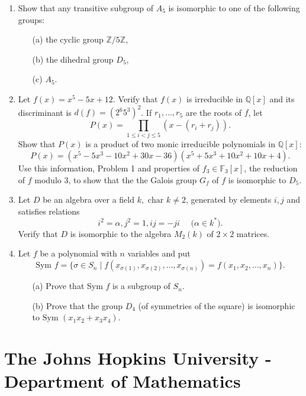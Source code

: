 \documentclass{article}
\begin{document}
\begin{enumerate}
    \item Show that any transitive subgroup of \(A_{5}\) is isomorphic to one of the following groups:
    \begin{itemize}
        \item[(a)] the cyclic group \(\mathbb{Z}/5\mathbb{Z}\),
        \item[(b)] the dihedral group \(D_{5}\),
        \item[(c)] \(A_{5}\).
    \end{itemize}

    \item Let \(f(x)=x^{5}-5x+12\). Verify that \(f(x)\) is irreducible in \(\mathbb{Q}[x]\) and its discriminant is \(d(f)=(2^{6}5^{3})^{2}\). If \(r_{1},\ldots,r_{5}\) are the roots of \(f\), let
    \[P(x)=\prod_{1\leq i<j\leq 5}(x-(r_{i}+r_{j})).\]
    Show that \(P(x)\) is a product of two monic irreducible polynomials in \(\mathbb{Q}[x]\):
    \[P(x)=(x^{5}-5x^{3}-10x^{2}+30x-36)(x^{5}+5x^{3}+10x^{2}+10x+4).\]
    Use this information, Problem 1 and properties of \(f_{3}\in\mathbb{F}_{3}[x]\), the reduction of \(f\) modulo 3, to show that the the Galois group \(G_{f}\) of \(f\) is isomorphic to \(D_{5}\).

    \item Let \(D\) be an algebra over a field \(k,\text{ char }k\neq 2\), generated by elements \(i,j\) and satisfies relations
    \[i^{2}=\alpha,j^{2}=1,ij=-ji\quad\text{ (\(\alpha\in k^{*}\)).}\]
    Verify that \(D\) is isomorphic to the algebra \(M_{2}(k)\) of \(2\times 2\) matrices.

    \item Let \(f\) be a polynomial with \(n\) variables and put
    \[\text{Sym }f=\{\sigma\in S_{n}\mid f(x_{\sigma(1)},x_{\sigma(2)},\ldots,x_{\sigma(n)})=f(x_{1},x_{2},\ldots,x_{n})\}.\]
    \begin{itemize}
        \item[(a)] Prove that Sym \(f\) is a subgroup of \(S_{n}\).
        \item[(b)] Prove that the group \(D_{4}\) (of symmetries of the square) is isomorphic to \(\text{Sym }(x_{1}x_{2}+x_{3}x_{4})\).
    \end{itemize}
\end{enumerate}

\section*{The Johns Hopkins University - Department of Mathematics}
\end{document}
